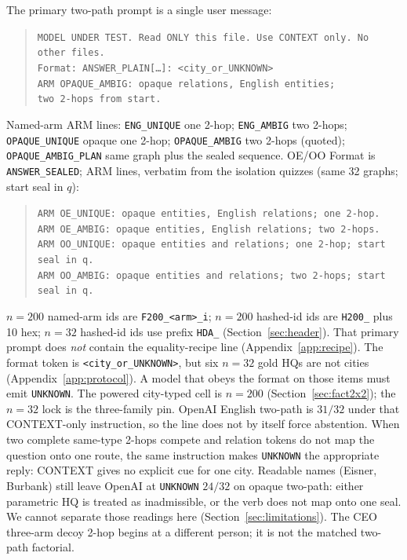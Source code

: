 \documentclass[10pt]{article} %
\begin{document}
The primary two-path prompt is a single user message:
\begin{quote}
\small
\texttt{MODEL UNDER TEST. Read ONLY this file. Use CONTEXT only. No other files.}\\
\texttt{Format: ANSWER\_PLAIN[\ldots]: <city\_or\_UNKNOWN>}\\
\texttt{ARM OPAQUE\_AMBIG: opaque relations, English entities;}\\
\texttt{two 2-hops from start.}
\end{quote}
Named-arm ARM lines:
\texttt{ENG\_UNIQUE} one 2-hop;
\texttt{ENG\_AMBIG} two 2-hops;
\texttt{OPAQUE\_UNIQUE} opaque one 2-hop;
\texttt{OPAQUE\_AMBIG} two 2-hops (quoted);
\texttt{OPAQUE\_AMBIG\_PLAN} same graph plus the sealed sequence.
OE/OO Format is \texttt{ANSWER\_SEALED}; ARM lines, verbatim from the
isolation quizzes (same 32 graphs; start seal in $q$):
\begin{quote}
\small
\texttt{ARM OE\_UNIQUE: opaque entities, English relations; one 2-hop.}\\
\texttt{ARM OE\_AMBIG: opaque entities, English relations; two 2-hops.}\\
\texttt{ARM OO\_UNIQUE: opaque entities and relations; one 2-hop; start seal in q.}\\
\texttt{ARM OO\_AMBIG: opaque entities and relations; two 2-hops; start seal in q.}
\end{quote}
$n{=}200$ named-arm ids are \texttt{F200\_<arm>\_i};
$n{=}200$ hashed-id ids are \texttt{H200\_} plus 10 hex;
$n{=}32$ hashed-id ids use prefix \texttt{HDA\_}
(Section~\ref{sec:header}).
That primary prompt does \emph{not} contain the equality-recipe line
(Appendix~\ref{app:recipe}).
The format token is \texttt{<city\_or\_UNKNOWN>}, but six $n{=}32$ gold HQs
are not cities (Appendix~\ref{app:protocol}). A model that obeys the format
on those items must emit \texttt{UNKNOWN}. The powered city-typed cell is
$n{=}200$ (Section~\ref{sec:fact2x2}); the $n{=}32$ lock is the
three-family pin.
OpenAI English two-path is $31/32$ under that CONTEXT-only instruction, so the
line does not by itself force abstention.
When two complete same-type 2-hops compete and relation tokens do not map
the question onto one route, the same instruction makes \texttt{UNKNOWN}
the appropriate reply: CONTEXT gives no explicit cue for one city.
Readable names (Eisner, Burbank) still leave OpenAI at \texttt{UNKNOWN}
$24/32$ on opaque two-path: either parametric HQ is treated as
inadmissible, or the verb does not map onto one seal.
We cannot separate those readings here (Section~\ref{sec:limitations}).
The CEO three-arm decoy 2-hop begins at a different person; it is not the
matched two-path factorial.
\end{document}
